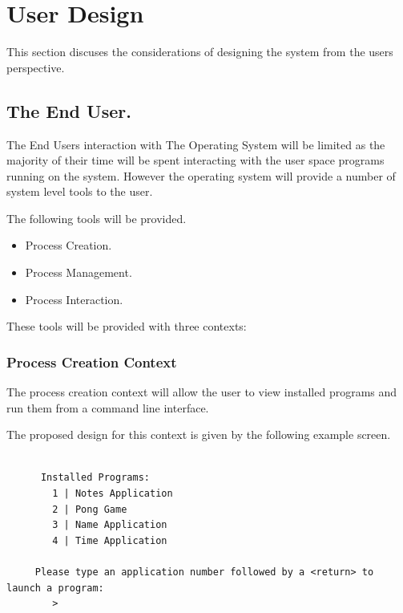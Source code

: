 \documentclass[a4paper]{report}
\begin{document}
\clearpage
\section*{User Design}

This section discuses the considerations of designing the system from the users perspective.

\subsection*{The End User.}

The End Users interaction with The Operating System will be limited as the majority of their time will be spent interacting with the user space programs running on the system. However the operating system will provide a number of system level tools to the user.

The following tools will be provided.
\begin{itemize}
\item Process Creation.
\item Process Management.
\item Process Interaction.
\end{itemize}

These tools will be provided with three contexts:

\subsubsection*{Process Creation Context}

The process creation context will allow the user to view installed programs and run them from a command line interface.

The proposed design for this context is given by the following example screen.
{\ttfamily \small
  \begin{framed}
    \begin{verbatim}

      Installed Programs:
        1 | Notes Application
        2 | Pong Game
        3 | Name Application
        4 | Time Application

     Please type an application number followed by a <return> to launch a program:
        > 

    \end{verbatim}
  \end{framed}
}
\end{document}
